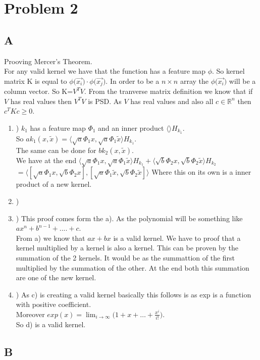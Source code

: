 \section{Problem 2}
\subsection{A}
Prooving Mercer's Theorem.\\
For any valid kernel we have that the function has a feature map $\phi$.
So kernel matrix K is equal to $\phi\big( \overrightarrow{x_i}\big) \cdot \phi\big( \overrightarrow{x_j}\big)$.
In order to be a $n\times n$ array the $\phi\big( \overrightarrow{x_i}\big)$ will be a column vector.
So K=$V^TV$. From the tranverse matrix definition we know that if $V$ has real values then $V^TV$ is 
PSD. As $V$ has real values and also all $c \in \mathbb{R}^n$ then $c^TKc \geq 0$.

\begin{enumerate}[label=\alph*]
\item) $k_1$ has a feature map $\Phi_1$ and an inner product $\langle\rangle H_{k_1}$.\\
So $ak_1(x,\widetilde{x}) = \langle \sqrt{a}\Phi_1{x}, \sqrt{a}\Phi_1{\widetilde{x}} \rangle H_{k_1}$. \\
The same can be done for $bk_2(x,\widetilde{x})$.\\
We have at the end 
$\langle \sqrt{a}\Phi_1{x}, \sqrt{a}\Phi_1{\widetilde{x}} \rangle H_{k_1} + \langle \sqrt{b}\Phi_2{x}, \sqrt{b}\Phi_2{\widetilde{x}} \rangle H_{k_2}$\\
$= \langle [\sqrt{a}\Phi_1{x},\sqrt{b}\Phi_2{x}], [\sqrt{a}\Phi_1{\widetilde{x}},\sqrt{b}\Phi_2{\widetilde{x}}] \rangle$
Where this on its own is a inner product of a new kernel.
\item) 
\item) This proof comes form the a). As the polynomial will be something like $ax^n+b^{n-1}+....+c$.\\
From a) we know that $ax+bx$ is a valid kernel. We have to proof that a kernel multiplied by a kernel
is also a kernel. This can be proven by the summation of the 2 kernels. It would be as the summattion of
the first multiplied by the summation of the other. At the end both this summation are one of the new kernel. 
\item) As c) is creating a valid kernel basically this follows is as exp is a function with positive coefficient.\\
Moreover $exp(x) = \lim_{i \to \infty} \big( 1+x+ \ldots + \frac{x^i}{i!} \big)$.\\
So d) is a valid kernel.
\end{enumerate}
\subsection{B}
